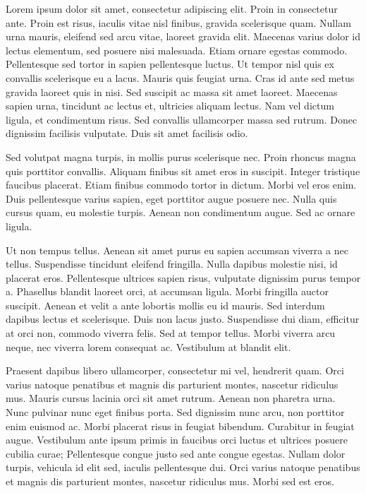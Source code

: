 



Lorem ipsum dolor sit amet, consectetur adipiscing elit. Proin in consectetur ante. Proin est risus, iaculis vitae nisl finibus, gravida scelerisque quam. Nullam urna mauris, eleifend sed arcu vitae, laoreet gravida elit. Maecenas varius dolor id lectus elementum, sed posuere nisi malesuada. Etiam ornare egestas commodo. Pellentesque sed tortor in sapien pellentesque luctus. Ut tempor nisl quis ex convallis scelerisque eu a lacus. Mauris quis feugiat urna. Cras id ante sed metus gravida laoreet quis in nisi. Sed suscipit ac massa sit amet laoreet. Maecenas sapien urna, tincidunt ac lectus et, ultricies aliquam lectus. Nam vel dictum ligula, et condimentum risus. Sed convallis ullamcorper massa sed rutrum. Donec dignissim facilisis vulputate. Duis sit amet facilisis odio.

Sed volutpat magna turpis, in mollis purus scelerisque nec. Proin rhoncus magna quis porttitor convallis. Aliquam finibus sit amet eros in suscipit. Integer tristique faucibus placerat. Etiam finibus commodo tortor in dictum. Morbi vel eros enim. Duis pellentesque varius sapien, eget porttitor augue posuere nec. Nulla quis cursus quam, eu molestie turpis. Aenean non condimentum augue. Sed ac ornare ligula.

Ut non tempus tellus. Aenean sit amet purus eu sapien accumsan viverra a nec tellus. Suspendisse tincidunt eleifend fringilla. Nulla dapibus molestie nisi, id placerat eros. Pellentesque ultrices sapien risus, vulputate dignissim purus tempor a. Phasellus blandit laoreet orci, at accumsan ligula. Morbi fringilla auctor suscipit. Aenean et velit a ante lobortis mollis eu id mauris. Sed interdum dapibus lectus et scelerisque. Duis non lacus justo. Suspendisse dui diam, efficitur at orci non, commodo viverra felis. Sed at tempor tellus. Morbi viverra arcu neque, nec viverra lorem consequat ac. Vestibulum at blandit elit.

Praesent dapibus libero ullamcorper, consectetur mi vel, hendrerit quam. Orci varius natoque penatibus et magnis dis parturient montes, nascetur ridiculus mus. Mauris cursus lacinia orci sit amet rutrum. Aenean non pharetra urna. Nunc pulvinar nunc eget finibus porta. Sed dignissim nunc arcu, non porttitor enim euismod ac. Morbi placerat risus in feugiat bibendum. Curabitur in feugiat augue. Vestibulum ante ipsum primis in faucibus orci luctus et ultrices posuere cubilia curae; Pellentesque congue justo sed ante congue egestas. Nullam dolor turpis, vehicula id elit sed, iaculis pellentesque dui. Orci varius natoque penatibus et magnis dis parturient montes, nascetur ridiculus mus. Morbi sed est eros.

